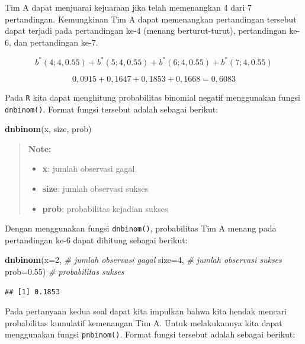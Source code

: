 \documentclass[]{book}
\newenvironment{Shaded}{\begin{snugshade}}{\end{snugshade}}
\newcommand{\KeywordTok}[1]{\textcolor[rgb]{0.13,0.29,0.53}{\textbf{#1}}}
\newcommand{\DataTypeTok}[1]{\textcolor[rgb]{0.13,0.29,0.53}{#1}}
\newcommand{\DecValTok}[1]{\textcolor[rgb]{0.00,0.00,0.81}{#1}}
\newcommand{\FloatTok}[1]{\textcolor[rgb]{0.00,0.00,0.81}{#1}}
\newcommand{\CommentTok}[1]{\textcolor[rgb]{0.56,0.35,0.01}{\textit{#1}}}
\newcommand{\NormalTok}[1]{#1}
\providecommand{\tightlist}{%
  \setlength{\itemsep}{0pt}\setlength{\parskip}{0pt}}
\begin{document}
Tim A dapat menjuarai kejuaraan jika telah memenangkan 4 dari 7
pertandingan. Kemungkinan Tim A dapat memenangkan pertandingan tersebut
dapat terjadi pada pertandingan ke-4 (menang berturut-turut),
pertandingan ke-6, dan pertandingan ke-7.

\[
b^{\ast}\left(4;4,0.55\right)+b^{\ast}\left(5;4,0.55\right)+b^{\ast}\left(6;4,0.55\right)+b^{\ast}\left(7;4,0.55\right)
\]

\[
0,0915+0,1647+0,1853+0,1668=0,6083
\]

Pada \texttt{R} kita dapat menghitung probabilitas binomial negatif
menggunakan fungsi \texttt{dnbinom()}. Format fungsi tersebut adalah
sebagai berikut:

\begin{Shaded}
\begin{Highlighting}[]
\KeywordTok{dnbinom}\NormalTok{(x, size, prob)}
\end{Highlighting}
\end{Shaded}

\begin{quote}
\textbf{Note: }

\begin{itemize}
\tightlist
\item
  \textbf{x}: jumlah observasi gagal
\item
  \textbf{size}: jumlah observasi sukses
\item
  \textbf{prob}: probabilitas kejadian sukses
\end{itemize}
\end{quote}

Dengan menggunakan fungsi \texttt{dnbinom()}, probabilitas Tim A menang
pada pertandingan ke-6 dapat dihitung sebagai berikut:

\begin{Shaded}
\begin{Highlighting}[]
\KeywordTok{dnbinom}\NormalTok{(}\DataTypeTok{x=}\DecValTok{2}\NormalTok{, }\CommentTok{# jumlah observasi gagal}
        \DataTypeTok{size=}\DecValTok{4}\NormalTok{, }\CommentTok{# jumlah observasi sukses}
        \DataTypeTok{prob=}\FloatTok{0.55}\NormalTok{) }\CommentTok{# probabilitas sukses}
\end{Highlighting}
\end{Shaded}

\begin{verbatim}
## [1] 0.1853
\end{verbatim}

Pada pertanyaan kedua soal dapat kita impulkan bahwa kita hendak mencari
probabilitas kumulatif kemenangan Tim A. Untuk melakukannya kita dapat
menggunakan fungsi \texttt{pnbinom()}. Format fungsi tersebut adalah
sebagai berikut:
\end{document}
